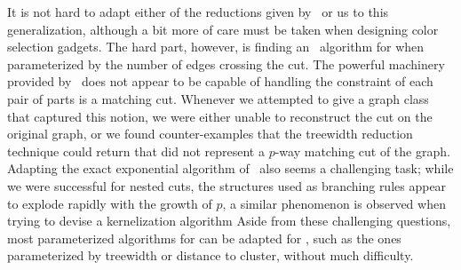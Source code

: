 
It is not hard to adapt either of the reductions given by~\cite{matching_cut_chvatal} or us to this generalization, although a bit more of care must be taken when designing color selection gadgets.
The hard part, however, is finding an \FPT\ algorithm for  when parameterized by the number of edges crossing the cut.
The powerful machinery provided by~\cite{marx_treewidth_reduction} does not appear to be capable of handling the constraint of each pair of parts is a matching cut.
Whenever we attempted to give a graph class that captured this notion, we were either unable to reconstruct the cut on the original graph, or we found counter-examples that the treewidth reduction technique could return that did not represent a $p$-way matching cut of the graph.
Adapting the exact exponential algorithm of~\cite{matching_cut_ipec} also seems a challenging task; while we were successful for nested cuts, the structures used as branching rules appear to explode rapidly with the growth of $p$, a similar phenomenon is observed when trying to devise a kernelization algorithm
Aside from these challenging questions, most parameterized algorithms for  can be adapted for , such as the ones parameterized by treewidth or distance to cluster, without much difficulty.





